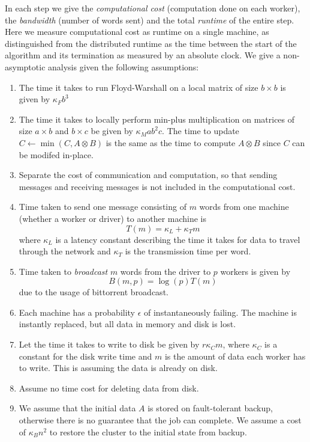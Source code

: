 \documentclass{article} %
\begin{document}
In each step we give the \emph{computational cost} (computation done
on each worker), the \emph{bandwidth} (number of words sent) and the
total \emph{runtime} of the entire step.  Here we measure
computational cost as runtime on a single machine, as distinguished
from the distributed runtime as the time between the start of the
algorithm and its termination as measured by an absolute clock.  We
give a non-asymptotic analysis given the following assumptions:

\begin{enumerate}
\item The time it takes to run Floyd-Warshall on a local matrix of size $b \times b$ is given by $\kappa_F b^3$
\item The time it takes to locally perform min-plus multiplication on
  matrices of size $a \times b$ and $b \times c$ be given by $\kappa_M
  ab^2c$. The time to update $C \leftarrow \min(C, A \otimes B)$ is the
  same as the time to compute $A \otimes B$ since $C$ can be modifed in-place.
\item Separate the cost of communication and computation, so that
  sending messages and receiving messages is not included in the
  computational cost.
\item Time taken to send one message consisting of $m$ words from one
  machine (whether a worker or driver) to another machine is
\[
T(m) = \kappa_L + \kappa_T m
\]
where $\kappa_L$ is a latency constant describing the time it takes
for data to travel through the network and $\kappa_T$ is the
transmission time per word.
\item Time taken to \emph{broadcast} $m$ words from the driver to $p$ workers is given by
\[
B(m, p) = \log(p) T(m)
\]
due to the usage of bittorrent broadcast.
\item Each machine has a probability $\epsilon$ of instantaneously
  failing.  The machine is instantly replaced, but all data in memory
  and disk is lost.
\item Let the time it takes to write to disk be given by $r\kappa_C
  m$, where $\kappa_C$ is a constant for the disk write time and $m$
  is the amount of data each worker has to write.  This is assuming
  the data is already on disk.
\item Assume no time cost for deleting data from disk.
\item We assume that the initial data $A$ is stored on fault-tolerant
  backup, otherwise there is no guarantee that the job can complete.
  We assume a cost of $\kappa_B n^2$ to restore the cluster to the
  initial state from backup.
\end{enumerate}
\end{document}
